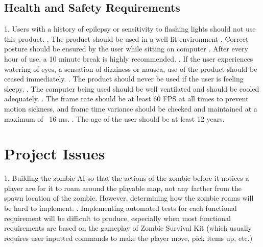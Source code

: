 \documentclass[12pt, titlepage]{article}
\begin{document}
\subsection{Health and Safety Requirements}

1. Users with a history of epilepsy or sensitivity to flashing lights should not use this product.
\newline
{}. The product should be used in a well lit environment
\newline
{}. Correct posture should be ensured by the user while sitting on computer
\newline
{}. After every hour of use, a 10 minute break is highly recommended.
\newline
{}. If the user experiences watering of eyes, a sensation of dizziness or nausea, use of the product should be ceased immediately.
\newline
{}. The product should never be used if the user is feeling sleepy.
\newline
{}. The computer being used should be well ventilated and should be cooled adequately.
\newline
{}. The frame rate should be at least 60 FPS at all times to prevent motion sickness, and frame time variance should be checked and maintained at a maximum of ~16 ms.
\newline
{}. The age of the user should be at least 12 years.


\section{Project Issues}
1. Building the zombie AI so that the actions of the zombie before it notices a player are for it to roam around the playable map, not any farther from the spawn location of the zombie. However, determining how the zombie roams will be hard to implement. 
. Implementing automated tests for each functional requirement will be difficult to produce, especially when most functional requirements are based on the gameplay of Zombie Survival Kit (which usually requires user inputted commands to make the player move, pick items up, etc.)
\end{document}
